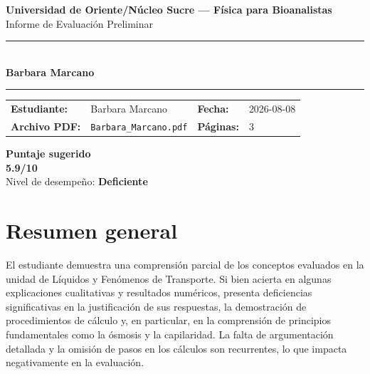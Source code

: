 \documentclass[11pt,a4paper]{article}
\begin{document}
\begin{center}
  {\Large\bfseries\color{azulTitulo} Universidad de Oriente/Núcleo Sucre --- Física para Bioanalistas}\\[4pt]
  {\large Informe de Evaluación Preliminar}\\[12pt]
  \rule{\linewidth}{1.2pt}\\[6pt]
  {\LARGE\bfseries Barbara Marcano}\\[4pt]
  \rule{\linewidth}{0.6pt}
\end{center}

\vspace{4pt}
\begin{tcolorbox}[cajaTitulo, title=Datos del informe]
\begin{tabular}{@{}llll@{}}
  \textbf{Estudiante:}  & Barbara Marcano  &
  \textbf{Fecha:}       & 2026-08-08 \\[4pt]
  \textbf{Archivo PDF:} & \texttt{Barbara\_Marcano.pdf}  &
  \textbf{Páginas:}     & 3 \\
\end{tabular}
\end{tcolorbox}

\vspace{6pt}
\begin{center}
  \begin{tcolorbox}[
    enhanced,
    colback=white, colframe=desempeno_deficiente,
    width=0.62\linewidth,
    boxrule=2pt,
    halign=center, valign=center,
    top=8pt, bottom=8pt,
  ]
    \centering
    {\large\bfseries Puntaje sugerido}\\[6pt]
    {\Huge\bfseries\color{desempeno_deficiente} 5.9/10}\\[6pt]
    {\large Nivel de desempeño: \textbf{\color{desempeno_deficiente} Deficiente}}
  \end{tcolorbox}
\end{center}

\section*{Resumen general}
El estudiante demuestra una comprensión parcial de los conceptos evaluados en la unidad de Líquidos y Fenómenos de Transporte. Si bien acierta en algunas explicaciones cualitativas y resultados numéricos, presenta deficiencias significativas en la justificación de sus respuestas, la demostración de procedimientos de cálculo y, en particular, en la comprensión de principios fundamentales como la ósmosis y la capilaridad. La falta de argumentación detallada y la omisión de pasos en los cálculos son recurrentes, lo que impacta negativamente en la evaluación.
\end{document}
